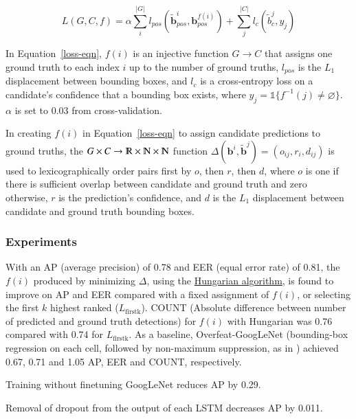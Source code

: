 \documentclass[a4paper, 12pt]{article}
\begin{document}
\begin{equation}
        L(G, C, f) = \alpha\sum_i^{|G|}
                             l_{pos}\left(\tilde{\boldsymbol{b}}_{pos}^i, \boldsymbol{b}_{pos}^{f(i)}\right) +
                     \sum_j^{|C|} l_c\left(\tilde{b}_c^j, y_j\right)
        \label{loss-eqn}
\end{equation}

In Equation~\ref{loss-eqn}, $f(i)$ is an injective function $G \rightarrow C$
that assigns one ground truth to each index $i$ up to the number of ground
truths, $l_{pos}$ is the $L_1$ displacement between bounding boxes, and $l_c$
is a cross-entropy loss on a candidate's confidence that a bounding box exists,
where $y_j = \mathbb{1}\{f^{-1}(j) \neq \varnothing\}$. $\alpha$ is set to 0.03
from cross-validation.

In creating $f(i)$ in Equation~\ref{loss-eqn} to assign candidate predictions
to ground truths, the
$G \times C \rightarrow \varmathbb{R} \times \varmathbb{N} \times \varmathbb{N}$
function
$\Delta\left(\boldsymbol{b}^i, \tilde{\boldsymbol{b}}^j\right) = (o_{ij}, r_i, d_{ij})$
is used to lexicographically order pairs first by $o$, then $r$, then $d$,
where $o$ is one if there is sufficient overlap between candidate and ground
truth and zero otherwise, $r$ is the prediction's confidence, and $d$ is the
$L_1$ displacement between candidate and ground truth bounding boxes.

\subsubsection{Experiments}

With an AP (average precision) of 0.78 and EER (equal error rate) of 0.81, the
$f(i)$ produced by minimizing $\Delta$, using the
\href{https://en.wikipedia.org/wiki/Hungarian_algorithm}{Hungarian algorithm},
is found to improve on AP and EER compared with a fixed assignment of $f(i)$,
or selecting the first $k$ highest ranked ($L_\textrm{firstk}$). COUNT
(Absolute difference between number of predicted and ground truth detections)
for $f(i)$ with Hungarian was 0.76 compared with 0.74 for $L_\textrm{firstk}$.
As a baseline, Overfeat-GoogLeNet (bounding-box regression on each cell,
followed by non-maximum suppression, as in
\cite{DBLP:journals/corr/SermanetEZMFL13}) achieved 0.67, 0.71 and 1.05 AP, EER
and COUNT, respectively.

Training without finetuning GoogLeNet reduces AP by 0.29.

Removal of dropout from the output of each LSTM decreases AP by 0.011.
\end{document}
